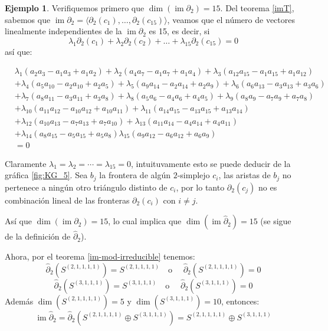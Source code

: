 \documentclass[12pt]{book}
\theoremstyle{definition}
\newtheorem{example}[theorem]{Ejemplo}
\DeclareMathOperator{\im}{im}
\newcounter{in}
\newcounter{ini}
\begin{document}
\begin{example}
Verifiquemos primero que $\dim(\im \partial_{2})=15$. Del teorema
\ref{imT}, sabemos que
$\im \partial_{2}=\langle\partial_{2}(c_{1}),\ldots,\partial_{2}(c_{15})\rangle$,
veamos que el número de vectores linealmente independientes de la
$\im \partial_{2}$ es 15, es
decir, si
$$\lambda_{1}\partial_{2}(c_{1})+\lambda_{2}\partial_{2}(c_{2})+\ldots+\lambda_{15}\partial_{2}(c_{15})=0$$
así que:




  



\begin{footnotesize}
  \begin{align*}
    &\lambda_{1}(a_{2}a_{3}-a_{1}a_{3}+a_{1}a_{2})+\lambda_{2}(a_{4}a_{7}-a_{1}a_{7}+a_{1}a_{4})+\lambda_{3}(a_{12}a_{15}-a_{1}a_{15}+a_{1}a_{12})\\
    &+\lambda_{4}(a_{5}a_{10}-a_{2}a_{10}+a_{2}a_{5})+\lambda_{5}(a_{9}a_{14}-a_{2}a_{14}+a_{2}a_{9})+\lambda_{6}(a_{6}a_{13}-a_{3}a_{13}+a_{3}a_{6})\\
    &+\lambda_{7}(a_{8}a_{11}-a_{3}a_{11}+a_{3}a_{8})+\lambda_{8}(a_{5}a_{6}-a_{4}a_{6}+a_{4}a_{5})+\lambda_{9}(a_{8}a_{9}-a_{7}a_{9}+a_{7}a_{8})\\
    &+\lambda_{10}(a_{11}a_{12}-a_{10}a_{12}+a_{10}a_{11})+\lambda_{11}(a_{14}a_{15}-a_{13}a_{15}+a_{13}a_{14})\\
    &+\lambda_{12}(a_{10}a_{13}-a_{7}a_{13}+a_{7}a_{10})+\lambda_{13}(a_{11}a_{14}-a_{4}a_{14}+a_{4}a_{11})\\
    &+\lambda_{14}(a_{8}a_{15}-a_{5}a_{15}+a_{5}a_{8})\lambda_{15}(a_{9}a_{12}-a_{6}a_{12}+a_{6}a_{9})\\
    &=0
  \end{align*}
\end{footnotesize}


Claramente $\lambda_{1}=\lambda_{2}=\cdots=\lambda_{15}=0$,
intuituvamente esto se puede deducir de la gráfica \ref{fig:KG_5}.
Sea $b_{j}$ la frontera de algún $2$-simplejo $c_{i}$, las aristas
de $b_{j}$ no pertenece a ningún otro triángulo distinto de $c_{i}$, por
lo tanto $\partial_{2}(c_{j})$ no es combinación lineal de las fronteras
$\partial_{2}(c_{i})$ con $i\neq j$.

Así que $\dim(\im\partial_{2})=15$, lo cual implica que
$\dim(\im\widehat\partial_{2})=15$ (se sigue de la definición de
$\widehat\partial_{2}$).

Ahora, por el teorema \ref{im-mod-irreducible} tenemos:
  $$\widehat\partial_{2}(S^{(2,1,1,1,1)})=S^{(2,1,1,1,1)} \quad \mbox{o }\quad \widehat\partial_{2}(S^{(2,1,1,1,1)})=0$$
  $$\widehat\partial_{2}(S^{(3,1,1,1)})=S^{(3,1,1,1)} \quad \mbox{o }\quad \widehat\partial_{2}(S^{(3,1,1,1)})=0$$
Además $\dim(S^{(2,1,1,1,1)})=5$ y $\dim(S^{(3,1,1,1)})=10$, entonces:
$$\im\widehat\partial_{2}=\widehat\partial_{2}(S^{(2,1,1,1,1)}\oplus S^{(3,1,1,1)})=S^{(2,1,1,1,1)}\oplus S^{(3,1,1,1)}$$

\end{example}




\printindex
\end{document}
